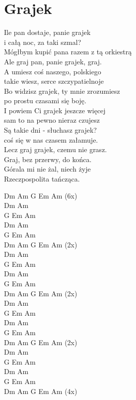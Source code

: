 \section{Grajek}
\begin{text}

Ile pan dostaje, panie grajek\\
i całą noc, za taki szmal?\\
Mógłbym kupić pana razem z tą orkiestrą\\
Ale graj pan, panie grajek, graj.\\


A umiesz coś naszego, polskiego\\
takie wiesz, serce szczypatielnoje\\
Bo widzisz grajek, ty mnie zrozumiesz\\
po prostu czasami się boję.\\


I powiem Ci grajek jeszcze więcej\\
sam to na pewno nieraz czujesz\\
Są takie dni - słuchasz grajek?\\
coś się w nas czasem załamuje.\\


Lecz graj grajek, czemu nie grasz.\\
Graj, bez przerwy, do końca.\\
Górala mi nie żal, niech żyje\\
Rzeczpospolita tańcząca.\\

\end{text}
\begin{chord}
Dm Am G Em Am (6x)\\
Dm Am\\
G Em Am\\
Dm Am\\
G Em Am\\

Dm Am G Em Am (2x)\\
Dm Am\\
G Em Am\\
Dm Am\\
G Em Am\\

Dm Am G Em Am (2x)\\
Dm Am\\
G Em Am\\
Dm Am\\
G Em Am\\

Dm Am G Em Am (2x)\\
Dm Am\\
G Em Am\\
Dm Am\\
G Em Am\\
Dm Am G Em Am (4x)\\
\end{chord}